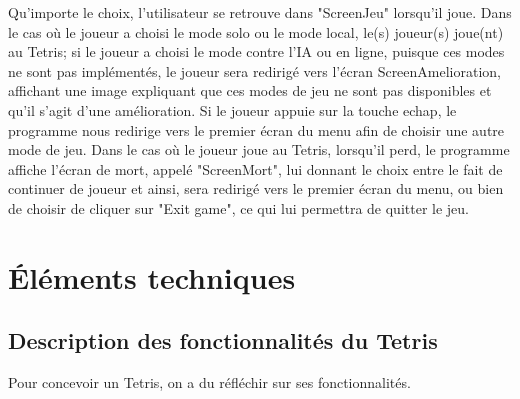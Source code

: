 \documentclass[a4paper, 11pt]{article}
\begin{document}
            \newpage
            Qu'importe le choix, l'utilisateur se retrouve dans "ScreenJeu" lorsqu'il joue. Dans le cas où le joueur a choisi le mode solo ou le mode local, le(s) joueur(s) joue(nt) au Tetris; si le joueur a choisi le mode contre l'IA ou en ligne, puisque ces modes ne sont pas implémentés, le joueur sera redirigé vers l'écran ScreenAmelioration, affichant une image expliquant que ces modes de jeu ne sont pas disponibles et qu'il s'agit d'une amélioration. Si le joueur appuie sur la touche echap, le programme nous redirige vers le premier écran du menu afin de choisir une autre mode de jeu. 
            \newline 
            \newline 
            Dans le cas où le joueur joue au Tetris, lorsqu'il perd, le programme affiche l'écran de mort, appelé "ScreenMort", lui donnant le choix entre le fait de continuer de joueur et ainsi, sera redirigé vers le premier écran du menu, ou bien de choisir de cliquer sur "Exit game", ce qui lui permettra de quitter le jeu.
        
    \section{Éléments techniques}
        \subsection{Description des fonctionnalités du Tetris}
        
            Pour concevoir un Tetris, on a du réfléchir sur ses fonctionnalités. 
            \newline
  
\end{document}
